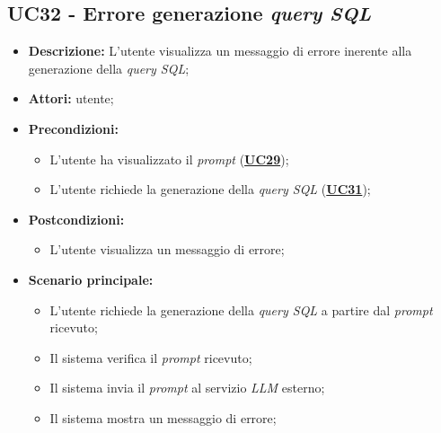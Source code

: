 \subsection{UC32 - Errore generazione \textit{query SQL}}
\label{sec:UC32}
\begin{itemize}
	\item \textbf{Descrizione:} L'utente visualizza un messaggio di errore inerente alla generazione della \textit{query SQL};
	\item \textbf{Attori:} utente;
	\item \textbf{Precondizioni:} 
	\begin{itemize}
		\item L'utente ha visualizzato il \textit{prompt} (\hyperref[sec:UC29]{\textbf{UC29}});
		\item L'utente richiede la generazione della \textit{query SQL} (\hyperref[sec:UC31]{\textbf{UC31}});
	\end{itemize}
	\item \textbf{Postcondizioni:} 
	\begin{itemize}
		\item L'utente visualizza un messaggio di errore;
	\end{itemize}
	\item \textbf{Scenario principale:}
	\begin{itemize}
		\item L'utente richiede la generazione della \textit{query SQL} a partire dal \textit{prompt} ricevuto;
		\item Il sistema verifica il \textit{prompt} ricevuto;
		\item Il sistema invia il \textit{prompt} al servizio \textit{LLM} esterno;
		\item Il sistema mostra un messaggio di errore;
	\end{itemize}
\end{itemize}

